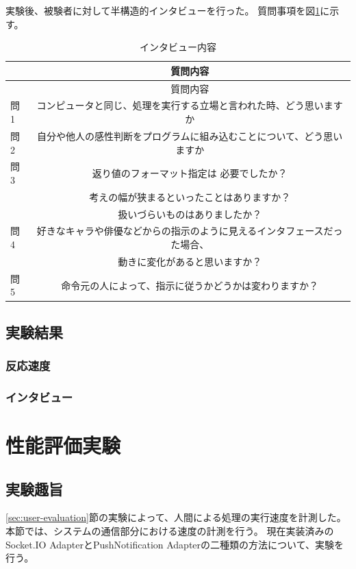 実験後、被験者に対して半構造的インタビューを行った。
質問事項を図\ref{table:interview}に示す。

\begin{longtable}[c]{@{}lc@{}}
\caption{インタビュー内容 \label{table:interview}}\tabularnewline
\toprule
& 質問内容\tabularnewline
\midrule
\endfirsthead
\toprule
& 質問内容\tabularnewline
\midrule
\endhead
問1 &
コンピュータと同じ、処理を実行する立場と言われた時、どう思いますか\tabularnewline
問2 &
自分や他人の感性判断をプログラムに組み込むことについて、どう思いますか\tabularnewline
問3 & 返り値のフォーマット指定は 必要でしたか？ \tabularnewline
& 考えの幅が狭まるといったことはありますか？ \tabularnewline
& 扱いづらいものはありましたか？\tabularnewline
問4 &
好きなキャラや俳優などからの指示のように見えるインタフェースだった場合、\tabularnewline
& 動きに変化があると思いますか？\tabularnewline
問5 &
命令元の人によって、指示に従うかどうかは変わりますか？\tabularnewline
\bottomrule
\end{longtable}

\subsection{実験結果}\label{ux5b9fux9a13ux7d50ux679c}

\subsubsection{反応速度}\label{ux53cdux5fdcux901fux5ea6}

\subsubsection{インタビュー}\label{ux30a4ux30f3ux30bfux30d3ux30e5ux30fc}

\section{性能評価実験}\label{ux6027ux80fdux8a55ux4fa1ux5b9fux9a13}

\subsection{実験趣旨}\label{ux5b9fux9a13ux8da3ux65e8-1}

\ref{sec:user-evaluation}節の実験によって、人間による処理の実行速度を計測した。
本節では、システムの通信部分における速度の計測を行う。
現在実装済みのSocket.IO AdapterとPushNotification
Adapterの二種類の方法について、実験を行う。

